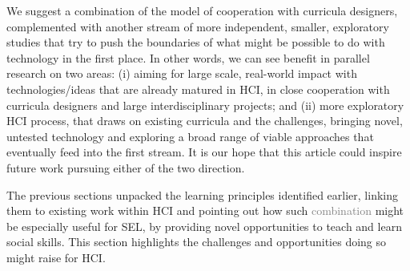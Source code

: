 \documentclass[prodmode,acmtochi]{acmsmall}
\newcommand{\todo}[1]{\textrm{\textrm{\textcolor{LightBlue}{[[#1]]} } } }
\newcommand{\rephrase}[1]{\textrm{\textrm{\textcolor{gray}{#1}}}}
\begin{document}
We suggest a combination of the  model of cooperation with curricula designers, complemented %
with another stream of more independent, smaller, exploratory studies that try to push the boundaries of what might be possible to do with technology in the first place.  In other words, we can see benefit in parallel research on two areas: (i) aiming for large scale, real-world impact with technologies/ideas that are already matured in HCI, in close cooperation with curricula designers and large interdisciplinary projects; and (ii) more exploratory HCI process, that draws on existing curricula and the challenges, bringing novel, untested technology and exploring a broad range of viable approaches that eventually feed into the first stream. It is our hope that this article could inspire future work pursuing either of the two direction. 




\iffalse
The previous sections unpacked the learning  principles identified earlier, linking them to existing work within HCI and pointing out how such \rephrase{combination} might be especially useful for SEL, by providing novel opportunities to teach and learn social skills.  
This section highlights the challenges and opportunities doing so might raise for HCI. 

\end{document}
